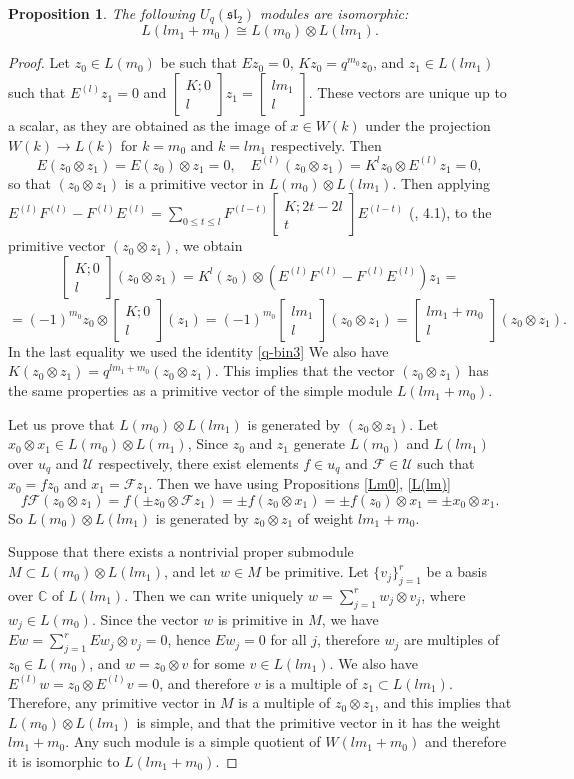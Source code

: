 \documentclass[11pt]{amsart}
\newcommand\lie[1]{\mathfrak{#1}}
\newcommand\qbin[2]{\left[  \begin{array}{c}  #1 \\ #2  \end{array}  \right]}
\newcommand{\CC}{\mathbb{C}}
\newtheorem{proposition}[theorem]{Proposition}
\begin{document}
\begin{proposition} \label{tensor_pr} 
The following $U_q(\lie{sl}_2)$  modules are isomorphic: 
\[ L(lm_1 + m_0)  \cong L(m_0)  \otimes L(lm_1) . \] 
\end{proposition} 
\begin{proof} 
Let $z_0 \in L(m_0)$ be such that $E z_0 =0$, $K z_0 = q^{m_0} z_0$, and $z_1 \in L(lm_1)$ such that $E^{(l)} z_1 =0$ 
and $\qbin{K ; 0}{l} z_1 = \qbin{lm_1}{l}$. These vectors are unique up to a scalar, as they are obtained as the image of 
$x \in W(k)$ under the projection $W(k) \to L(k)$ for  $k=m_0$ and $k = lm_1$ respectively. 
Then 
\[ E(z_0 \otimes z_1) = E (z_0) \otimes z_1 = 0 , \quad  E^{(l)} (z_0 \otimes z_1) = 
K^l z_0 \otimes E^{(l)}  z_1 =0 ,\] 
so that $(z_0 \otimes z_1)$ is a primitive vector in $L(m_0) \otimes L(lm_1)$. 
Then applying $E^{(l)} F^{(l)} - F^{(l)} E^{(l)} = \sum\limits_{0 \leq t \leq l} F^{(l-t)} \qbin{K ; 2t-2l}{t} E^{(l-t)}$ (\cite{Lus89}, 4.1),  to the primitive vector $(z_0 \otimes z_1)$, we obtain 
\[ \qbin{K ; 0 }{l} (z_0 \otimes z_1) = K^l (z_0) \otimes (E^{(l)} F^{(l)} - F^{(l)} E^{(l)}) z_1 = \] 
\[ = (-1)^{m_0} z_0 \otimes \qbin{K ; 0}{l} (z_1) = (-1)^{m_0} \qbin{lm_1}{l} (z_0 \otimes z_1) = \qbin{lm_1 + m_0}{l} (z_0 \otimes z_1) .\] 
In the last equality we used the identity \ref{q-bin3}
We also have $K(z_0 \otimes z_1) =  q^{lm_1+m_0} (z_0 \otimes z_1)$. This implies that the vector $(z_0 \otimes z_1)$ has the same properties as a primitive vector of the simple module $L(lm_1 + m_0)$. 

Let us prove that $L(m_0) \otimes L(lm_1)$ is generated by $(z_0 \otimes z_1)$. Let $x_0 \otimes x_1 \in L(m_0) \otimes L(m_1)$, Since $z_0$ and $z_1$ generate $L(m_0)$ and $L(lm_1)$ over $u_q$ and $\mathcal {U}$ respectively, there exist elements $f \in u_q$ and $\mathcal{F} \in \mathcal{U}$ such that $x_0 = f z_0$ and $x_1 = \mathcal{F} z_1$. Then we have using Propositions \ref{Lm0}, \ref{L(lm)} 
\[ f \mathcal{F} (z_0 \otimes z_1) = f(\pm z_0 \otimes \mathcal{F} z_1) = \pm f(z_0 \otimes x_1) = \pm f(z_0) \otimes x_1 = \pm x_0 \otimes x_1 .\] 
So $L(m_0) \otimes L(lm_1)$ is  generated by $z_0 \otimes z_1$ of weight $lm_1+ m_0$. 

Suppose that there exists a nontrivial proper submodule $M \subset L(m_0) \otimes L(lm_1)$, and let $w \in M$ be primitive.  Let $\{v_j\}_{j=1}^r$ be a basis over $\CC$ of $L(lm_1)$. Then we can write uniquely 
$w = \sum_{j=1}^r w_j \otimes v_j$, where $w_j \in L(m_0)$. Since the vector $w$ is primitive in $M$, we have 
$Ew = \sum_{j=1}^r E w_j \otimes v_j =0$, hence $Ew_j =0$ for all $j$, therefore $w_j$ are multiples of $z_0 \in L(m_0)$, and $w = z_0 \otimes v$ for some $v \in L(lm_1)$. We also have 
$E^{(l)} w = z_0 \otimes E^{(l)} v =0$, and therefore $v$ is a multiple of $z_1 \subset L(lm_1)$. Therefore, any primitive vector in $M$ is a multiple of $z_0 \otimes z_1$, and this implies that $L(m_0) \otimes L(lm_1)$ is simple, and that the primitive vector in it has the weight $lm_1 + m_0$. Any such module is a simple quotient of $W(lm_1 + m_0)$ and therefore it is isomorphic to $L(lm_1+ m_0)$.
\end{proof}  
\end{document}
